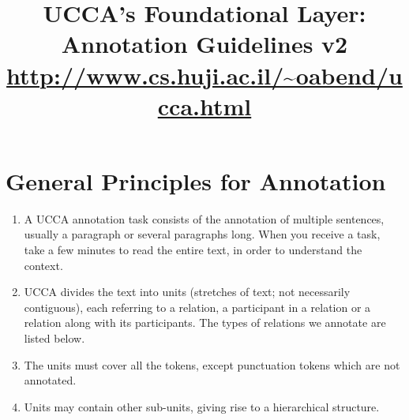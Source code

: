 \documentclass[11pt]{article}
\title{UCCA's Foundational Layer:  Annotation Guidelines v2\\
\url{http://www.cs.huji.ac.il/~oabend/ucca.html}}
\newcommand{\dcom}[1]{\textit{\color{blue}{#1}}}
\begin{document}
\maketitle
\tableofcontents

\newpage


\section{General Principles for Annotation}

\begin{enumerate}

\item
  A UCCA annotation task consists of the annotation of multiple sentences, usually a 
  paragraph or several paragraphs long.
  When you receive a task, take a few minutes to read the entire text, in order to 
  understand the context.
    

 \item
  UCCA divides the text into units (stretches of text; not necessarily contiguous), each referring to a relation,
  a participant in a relation or a relation along with its participants. The types of relations we annotate
  are listed below.






\item
  The units must cover all the tokens, except punctuation tokens which are not annotated.
  
\item
  Units may contain other sub-units, giving rise to a hierarchical structure.
  

\end{enumerate}
\end{document}
